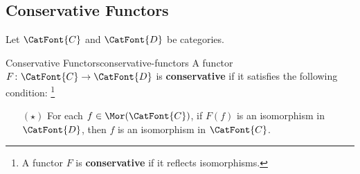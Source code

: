 \subsection{Conservative Functors}\label{subsection-conservative-functors}
Let $\CatFont{C}$ and $\CatFont{D}$ be categories.
\begin{definition}{Conservative Functors}{conservative-functors}%
    A functor $F\colon\CatFont{C}\to\CatFont{D}$ is \textbf{conservative} if it satisfies the following condition:%
    \footnote{%
        A functor $F$ is \textbf{conservative} if it reflects isomorphisms.
        \par\vspace*{-1.75\baselineskip}
    }%
    \begin{itemize}
        \item[$(\star)$]For each $f\in\Mor(\CatFont{C})$, if $F(f)$ is an isomorphism in $\CatFont{D}$, then $f$ is an isomorphism in $\CatFont{C}$.%
    \end{itemize}
\end{definition}
